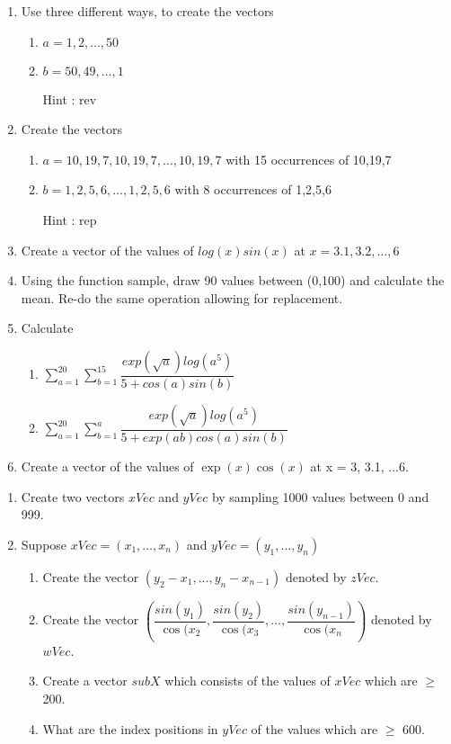 \documentclass[11pt,a4paper]{article}
\newcommand{\1}{\mathbb{1}}
\begin{document}
\begin{Exercise}[title=Vectors - Introduction]
\begin{enumerate}
\item Use three different ways, to create the vectors 
\begin{enumerate}
\item $a=1,2,\ldots,50$
\item $b=50,49,\ldots,1$
\item[Hint]: rev
\end{enumerate} 
\item Create the vectors 
\begin{enumerate}
\item $a=10,19,7,10,19,7,\ldots,10,19,7$ with 15 occurrences of 10,19,7
\item $b=1,2,5,6,\ldots,1,2,5,6$ with 8 occurrences of 1,2,5,6
\item[Hint]: rep
\end{enumerate} 
\item Create a vector of the values of $log(x)sin(x)$ at $x=3.1,3.2,\ldots,6$
\item Using the function sample, draw 90 values between (0,100) and calculate the mean. Re-do the same operation allowing for replacement. 
\item Calculate 
\begin{enumerate}
\item $\sum_{a=1}^{20}\sum_{b=1}^{15}\dfrac{exp(\sqrt{a})log(a^5)}{5+cos(a)sin(b)}$
\item $\sum_{a=1}^{20}\sum_{b=1}^{a} \dfrac{exp(\sqrt{a})log(a^5)}{5+exp(ab)cos(a)sin(b)}$
\end{enumerate}
\item Create a vector of the values of $\exp(x) \cos(x)$ at x = 3, 3.1, ...6.
\end{enumerate}
\end{Exercise}

\begin{Exercise}[title=Vectors - Advanced]
\begin{enumerate}
\item Create two vectors $xVec$ and $yVec$ by sampling 1000 values between 0 and 999.
\item Suppose $xVec = (x_1, \ldots, x_n)$ and $yVec = (y_1, \ldots, y_n)$
\begin{enumerate}
\item Create the vector $(y_2-x_1,\ldots, y_n -x_{n-1})$ denoted by $zVec$.
\item Create the vector $(\dfrac{sin(y_1)}{\cos(x_2},\dfrac{sin(y_2)}{\cos(x_3}, \ldots, \dfrac{sin(y_{n-1})}{\cos(x_n})$ denoted by $wVec$.
\item Create a vector $subX$ which consists of the values of $xVec$ which are $\geq$ 200.
\item What are the index positions in $yVec$ of the values which are $\geq$ 600.
\end{enumerate}
\end{enumerate}
\end{Exercise}
\end{document}
